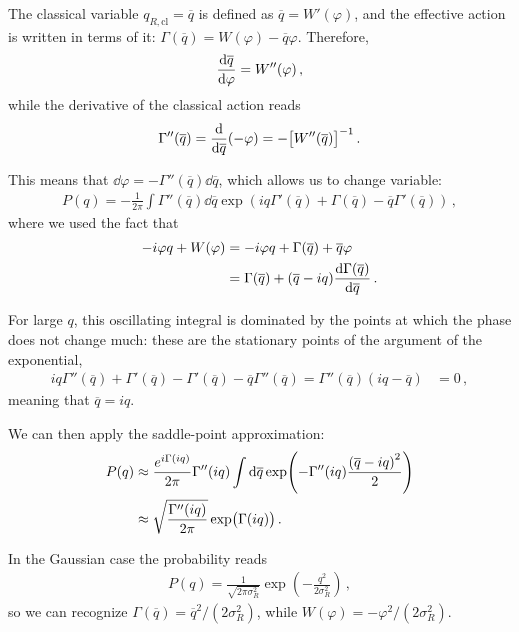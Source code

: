 \documentclass[main.tex]{subfiles}
\begin{document}
The classical variable \(q _{R, \text{cl}} = \overline{q}\) is defined as \(\overline{q}= W' (\varphi ) \), and the effective action is written in terms of it: \(\Gamma (\overline{q}) = W(\varphi ) - \overline{q} \varphi \). Therefore, 
%
\begin{align}
\dv{\overline{q}}{\varphi } = W''(\varphi )
\,,
\end{align}
%
while the derivative of the classical action reads 
%
\begin{align}
\Gamma '' (\overline{q})
= \dv{}{\overline{q}}
\qty(- \varphi ) 
= - \qty[W''(\overline{q})]^{-1}
\,.
\end{align}

This means that \(\dd{\varphi } = - \Gamma'' (\overline{q}) \dd{\overline{q}}\), which allows us to change variable: 
%
\begin{align}
P(q) = -\frac{1}{2 \pi } \int \Gamma '' (\overline{q}) \dd{\overline{q}}
\exp( i q \Gamma '(\overline{q}) + \Gamma (\overline{q}) - \overline{q} \Gamma ' (\overline{q}))
\,,
\end{align}
%
where we used the fact that 
%
\begin{align}
- i \varphi q + W(\varphi ) &= - i \varphi q + \Gamma (\overline{q}) + \overline{q} \varphi    \\
&= \Gamma (\overline{q}) + (\overline{q} - iq) \dv{\Gamma (\overline{q})}{\overline{q}}
\,.
\end{align}

For large \(q\), this oscillating integral is dominated by the points at which the phase does not change much: these are the stationary points of the argument of the exponential, 
%
\begin{align}
iq \Gamma'' (\overline{q})  
+ \Gamma '(\overline{q}) - \Gamma '(\overline{q}) - \overline{q} \Gamma '' (\overline{q}) 
=
\Gamma'' (\overline{q}) (iq - \overline{q} )
&= 0
\,,
\end{align}
%
meaning that \(\overline{q} = iq\).

We can then apply the saddle-point approximation: 
%
\begin{align}
P(q) &\approx \frac{e^{i \Gamma (iq)}}{2 \pi } \Gamma '' (iq)
\int \dd{\overline{q}} \exp(- \Gamma ''(iq) \frac{\qty(\overline{q} - iq)^2}{2})  \\
&\approx \sqrt{\frac{\Gamma '' (iq)}{2 \pi }} \exp(\Gamma (iq))
\,.
\end{align}

In the Gaussian case the probability reads 
%
\begin{align}
P(q) = \frac{1}{\sqrt{2 \pi \sigma _R^2}} \exp(- \frac{q^2}{2 \sigma _R^2})
\,,
\end{align}
%
so we can recognize \(\Gamma (\overline{q}) = \overline{q}^2 / (2 \sigma _R^2)\), while \(W (\varphi ) = -\varphi^2 / (2 \sigma _R^2)\). 
\end{document}
